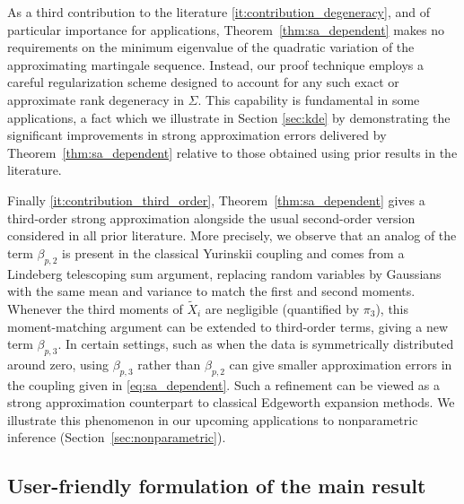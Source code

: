 As a third contribution to the literature \ref{it:contribution_degeneracy}, and
of particular importance for applications, Theorem~\ref{thm:sa_dependent} makes
no requirements on the minimum eigenvalue of the quadratic variation of the
approximating martingale sequence. Instead, our proof technique employs a
careful regularization scheme designed to account for any such exact or
approximate rank degeneracy in $\Sigma$. This capability is fundamental in some
applications, a fact which we illustrate in Section \ref{sec:kde} by
demonstrating the significant improvements in strong approximation errors
delivered by Theorem~\ref{thm:sa_dependent} relative to those obtained using
prior results in the literature.

Finally \ref{it:contribution_third_order},
Theorem~\ref{thm:sa_dependent} gives
a third-order strong approximation alongside the usual second-order
version considered in all prior literature.
More precisely, we observe that an analog of the term
$\beta_{p,2}$ is present in the
classical Yurinskii coupling and comes from a Lindeberg
telescoping sum argument,
replacing random variables by Gaussians with the same mean
and variance to match the first and second moments.
Whenever the third moments of $\tilde X_i$ are negligible
(quantified by $\pi_3$), this moment-matching argument can be extended to
third-order terms, giving a new term $\beta_{p,3}$.
In certain settings, such as when the data is symmetrically
distributed around zero, using $\beta_{p,3}$ rather than $\beta_{p,2}$
can give smaller approximation errors in the coupling given in
\eqref{eq:sa_dependent}.
Such a refinement can be viewed as a strong approximation counterpart
to classical Edgeworth expansion methods.
We illustrate this phenomenon in our
upcoming applications to nonparametric inference
(Section~\ref{sec:nonparametric}).

\subsection{User-friendly formulation of the main result}%

